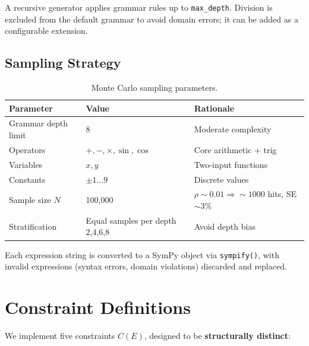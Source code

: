 \documentclass[11pt,a4paper]{article}
\begin{document}
A recursive generator applies grammar rules up to \texttt{max\_depth}. Division is excluded from the default grammar to avoid domain errors; it can be added as a configurable extension.

\subsection{Sampling Strategy}
\begin{table}[h]
\centering\small
\begin{tabular}{lll}
\toprule
\textbf{Parameter} & \textbf{Value} & \textbf{Rationale} \\
\midrule
Grammar depth limit & 8 & Moderate complexity \\
Operators & $+, -, \times, \sin, \cos$ & Core arithmetic + trig \\
Variables & $x, y$ & Two-input functions \\
Constants & $\pm 1 \ldots 9$ & Discrete values \\
Sample size $N$ & 100{,}000 & $\rho \sim 0.01 \Rightarrow {\sim}1000$ hits, SE ${\sim}3\%$ \\
Stratification & Equal samples per depth 2,4,6,8 & Avoid depth bias \\
\bottomrule
\end{tabular}
\caption{Monte Carlo sampling parameters.}
\end{table}

Each expression string is converted to a SymPy object via \texttt{sympify()}, with invalid expressions (syntax errors, domain violations) discarded and replaced.

\section{Constraint Definitions}
\label{sec:constraints}

We implement five constraints $C(E)$, designed to be \textbf{structurally distinct}:
\end{document}
